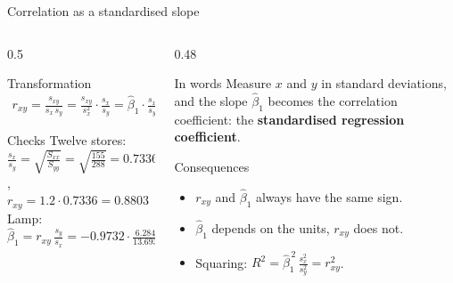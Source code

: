 \documentclass[aspectratio=169,11pt]{beamer}
\begin{document}
\begin{frame}{Correlation as a standardised slope}
  \begin{columns}[T]
    \begin{column}{0.5\textwidth}
      \begin{block}{Transformation}
        \begin{align*}
          r_{xy} = \frac{s_{xy}}{s_x\,s_y}
            = \frac{s_{xy}}{s_x^{2}} \cdot \frac{s_x}{s_y}
            = \hat{\beta}_1 \cdot \frac{s_x}{s_y}
        \end{align*}
        \vspace{-12pt}
      \end{block}
      \begin{exampleblock}{Checks}
        Twelve stores: $\frac{s_x}{s_y} = \sqrt{\frac{S_{xx}}{S_{yy}}} = \sqrt{\frac{155}{288}} = 0.7336$,
        $r_{xy} = 1.2 \cdot 0.7336 = 0.8803$ \checkmark\\[3pt]
        Lamp: $\hat\beta_1=r_{xy}\,\frac{s_y}{s_x}=-0.9732\cdot \frac{6.2849}{13.6931}=-0.4467$ \checkmark
      \end{exampleblock}
    \end{column}
    \begin{column}{0.48\textwidth}
      \begin{block}{In words}
        Measure $x$ and $y$ in standard deviations, and the slope
        $\hat{\beta}_1$ becomes the correlation coefficient: the
        \textbf{standardised regression coefficient}.
      \end{block}
      \begin{alertblock}{Consequences}
        \begin{itemize}
          \item $r_{xy}$ and $\hat{\beta}_1$ always have the same sign.
          \item $\hat{\beta}_1$ depends on the units, $r_{xy}$ does not.
          \item Squaring: $R^{2} = \hat{\beta}_1^{\,2}\,\frac{s_x^{2}}{s_y^{2}} = r_{xy}^{2}$.
        \end{itemize}
      \end{alertblock}
    \end{column}
  \end{columns}
\end{frame}
\end{document}
